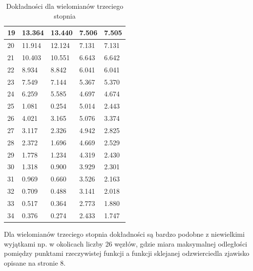 \documentclass{article}
\begin{document}
\begin{table}[H]
\begin{tabular}{|l|ll|ll|}
19 & \multicolumn{1}{l|}{13.364}   & 13.440    & \multicolumn{1}{l|}{7.506}    & 7.505    \\ \hline
20 & \multicolumn{1}{l|}{11.914}   & 12.124    & \multicolumn{1}{l|}{7.131}    & 7.131    \\ \hline
21 & \multicolumn{1}{l|}{10.403}   & 10.551    & \multicolumn{1}{l|}{6.643}    & 6.642    \\ \hline
22 & \multicolumn{1}{l|}{8.934}   & 8.842    & \multicolumn{1}{l|}{6.041}    & 6.041    \\ \hline
23 & \multicolumn{1}{l|}{7.549}   & 7.144    & \multicolumn{1}{l|}{5.367}    & 5.370    \\ \hline
24 & \multicolumn{1}{l|}{6.259}   & 5.585    & \multicolumn{1}{l|}{4.697}    & 4.674    \\ \hline
25 & \multicolumn{1}{l|}{1.081}   & 0.254    & \multicolumn{1}{l|}{5.014}    & 2.443    \\ \hline
26 & \multicolumn{1}{l|}{4.021}   & 3.165    & \multicolumn{1}{l|}{5.076}    & 3.374    \\ \hline
27 & \multicolumn{1}{l|}{3.117}   & 2.326    & \multicolumn{1}{l|}{4.942}    & 2.825    \\ \hline
28 & \multicolumn{1}{l|}{2.372}   & 1.696    & \multicolumn{1}{l|}{4.669}    & 2.529    \\ \hline
29 & \multicolumn{1}{l|}{1.778}   & 1.234    & \multicolumn{1}{l|}{4.319}    & 2.430    \\ \hline
30 & \multicolumn{1}{l|}{1.318}   & 0.900    & \multicolumn{1}{l|}{3.929}    & 2.301    \\ \hline
31 & \multicolumn{1}{l|}{0.969}   & 0.660    & \multicolumn{1}{l|}{3.526}    & 2.163    \\ \hline
32 & \multicolumn{1}{l|}{0.709}   & 0.488    & \multicolumn{1}{l|}{3.141}    & 2.018    \\ \hline
33 & \multicolumn{1}{l|}{0.517}   & 0.364    & \multicolumn{1}{l|}{2.773}    & 1.880    \\ \hline
34 & \multicolumn{1}{l|}{0.376}   & 0.274    & \multicolumn{1}{l|}{2.433}    & 1.747    \\ \hline
\end{tabular}
\caption{Dokładności dla wielomianów trzeciego stopnia}
\end{table}

Dla wielomianów trzeciego stopnia dokładności są bardzo podobne z niewielkimi wyjątkami np. w okolicach liczby 26 węzłów, gdzie
miara maksymalnej odległości pomiędzy punktami rzeczywistej funkcji a funkcji sklejanej odzwierciedla zjawisko opisane na 
stronie 8.
\end{document}

